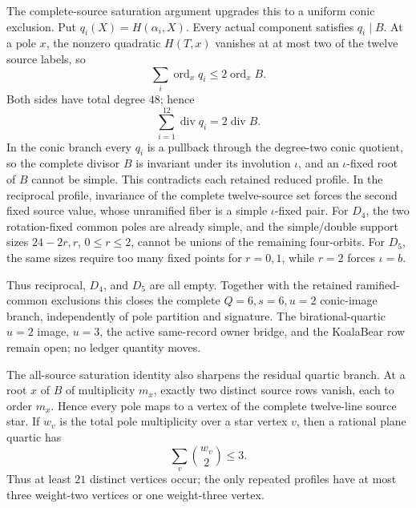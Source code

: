\documentclass[11pt]{article}
\begin{document}
The complete-source saturation argument upgrades this to a uniform conic
exclusion.  Put \(q_i(X)=H(\alpha_i,X)\).  Every actual component satisfies
\(q_i\mid B\).  At a pole \(x\), the nonzero quadratic \(H(T,x)\) vanishes
at at most two of the twelve source labels, so
\[
  \sum_i\operatorname{ord}_xq_i
  \le2\operatorname{ord}_xB.
\]
Both sides have total degree \(48\); hence
\[
  \sum_{i=1}^{12}\operatorname{div}q_i
  =2\operatorname{div}B.
\]
In the conic branch every \(q_i\) is a pullback through the degree-two
conic quotient, so the complete divisor \(B\) is invariant under its
involution \(\iota\), and an \(\iota\)-fixed root of \(B\) cannot be simple.
This contradicts each retained reduced profile.  In the reciprocal profile,
invariance of the complete twelve-source set forces the second fixed source
value, whose unramified fiber is a simple \(\iota\)-fixed pair.  For
\(D_4\), the two rotation-fixed common poles are already simple, and the
simple/double support sizes \(24-2r,r\), \(0\le r\le2\), cannot be unions
of the remaining four-orbits.  For \(D_5\), the same sizes require too many
fixed points for \(r=0,1\), while \(r=2\) forces \(\iota=b\).

Thus reciprocal, \(D_4\), and \(D_5\) are all empty.  Together with the
retained ramified-common exclusions this closes the complete
\(Q=6,s=6,u=2\) conic-image branch, independently of pole partition and
signature.  The birational-quartic \(u=2\) image, \(u=3\), the active
same-record owner bridge, and the KoalaBear row remain open; no ledger
quantity moves.

The all-source saturation identity also sharpens the residual quartic
branch.  At a root \(x\) of \(B\) of multiplicity \(m_x\), exactly two
distinct source rows vanish, each to order \(m_x\).  Hence every pole maps
to a vertex of the complete twelve-line source star.  If \(w_v\) is the
total pole multiplicity over a star vertex \(v\), then a rational plane
quartic has
\[
  \sum_v\binom{w_v}{2}\le3.
\]
Thus at least \(21\) distinct vertices occur; the only repeated profiles
have at most three weight-two vertices or one weight-three vertex.
\end{document}
